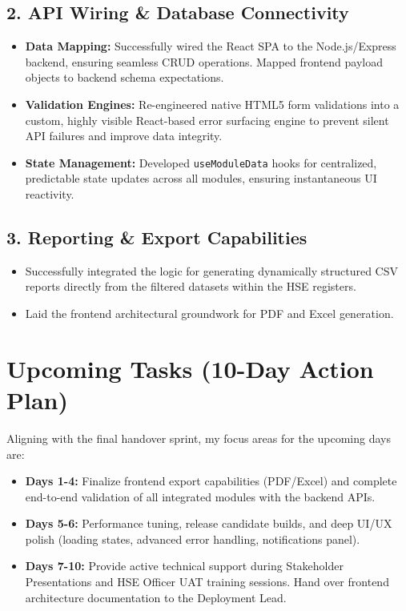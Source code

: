 \documentclass[12pt, a4paper]{article}
\begin{document}
\subsection{2. API Wiring \& Database Connectivity}
\begin{itemize}[leftmargin=*, label=$\circ$]
    \item \textbf{Data Mapping:} Successfully wired the React SPA to the Node.js/Express backend, ensuring seamless CRUD operations. Mapped frontend payload objects to backend schema expectations.
    \item \textbf{Validation Engines:} Re-engineered native HTML5 form validations into a custom, highly visible React-based error surfacing engine to prevent silent API failures and improve data integrity.
    \item \textbf{State Management:} Developed \texttt{useModuleData} hooks for centralized, predictable state updates across all modules, ensuring instantaneous UI reactivity.
\end{itemize}

\subsection{3. Reporting \& Export Capabilities}
\begin{itemize}[leftmargin=*, label=$\circ$]
    \item Successfully integrated the logic for generating dynamically structured CSV reports directly from the filtered datasets within the HSE registers.
    \item Laid the frontend architectural groundwork for PDF and Excel generation.
\end{itemize}

\section{Upcoming Tasks (10-Day Action Plan)}
Aligning with the final handover sprint, my focus areas for the upcoming days are:
\begin{itemize}
    \item \textbf{Days 1-4:} Finalize frontend export capabilities (PDF/Excel) and complete end-to-end validation of all integrated modules with the backend APIs.
    \item \textbf{Days 5-6:} Performance tuning, release candidate builds, and deep UI/UX polish (loading states, advanced error handling, notifications panel).
    \item \textbf{Days 7-10:} Provide active technical support during Stakeholder Presentations and HSE Officer UAT training sessions. Hand over frontend architecture documentation to the Deployment Lead.
\end{itemize}
\end{document}
